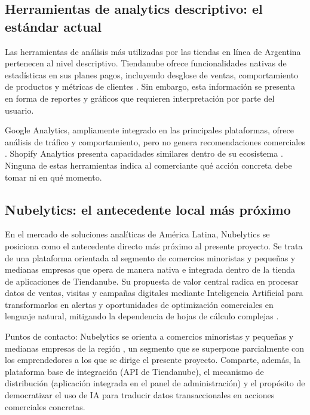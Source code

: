 \subsection{Herramientas de analytics descriptivo: el estándar actual}
\label{sec:analytics-descriptivo}

Las herramientas de análisis más utilizadas por las tiendas en línea de Argentina pertenecen al nivel descriptivo. Tiendanube ofrece funcionalidades nativas de estadísticas en sus planes pagos, incluyendo desglose de ventas, comportamiento de productos y métricas de clientes \parencite{TiendanubeEstadisticas2025}. Sin embargo, esta información se presenta en forma de reportes y gráficos que requieren interpretación por parte del usuario.

Google Analytics, ampliamente integrado en las principales plataformas, ofrece análisis de tráfico y comportamiento, pero no genera recomendaciones comerciales \parencite{GoogleAnalytics2025}. Shopify Analytics presenta capacidades similares dentro de su ecosistema \parencite{ShopifyAnalytics2025}. Ninguna de estas herramientas indica al comerciante qué acción concreta debe tomar ni en qué momento.

\subsection{Nubelytics: el antecedente local más próximo}
\label{sec:nubelytics}

En el mercado de soluciones analíticas de América Latina, Nubelytics se posiciona como el antecedente directo más próximo al presente proyecto. Se trata de una plataforma orientada al segmento de comercios minoristas y pequeñas y medianas empresas que opera de manera nativa e integrada dentro de la tienda de aplicaciones de Tiendanube. Su propuesta de valor central radica en procesar datos de ventas, visitas y campañas digitales mediante Inteligencia Artificial para transformarlos en alertas y oportunidades de optimización comerciales en lenguaje natural, mitigando la dependencia de hojas de cálculo complejas \parencite{Nubelytics2025}.

Puntos de contacto: Nubelytics se orienta a comercios minoristas y pequeñas y medianas empresas de la región \parencite{Nubelytics2025}, un segmento que se superpone parcialmente con los emprendedores a los que se dirige el presente proyecto. Comparte, además, la plataforma base de integración (API de Tiendanube), el mecanismo de distribución (aplicación integrada en el panel de administración) y el propósito de democratizar el uso de IA para traducir datos transaccionales en acciones comerciales concretas.

